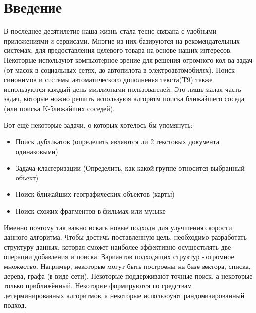 \newpage
\section{Введение}

\begin{justify}

    В последнее десятилетие наша жизнь стала тесно связана с 
    удобными приложениями и сервисами. Многие из них базируются 
    на рекомендательных системах, для предоставления целевого 
    товара на основе наших интересов. Некоторые используют 
    компьютерное зрение для решения огромного кол-ва задач 
    (от масок в социальных сетях, до автопилота в электроавтомобилях). 
    Поиск синонимов и системы автоматического дополнения текста(T9)
    также используются каждый день миллионами пользователей. Это лишь
    малая часть задач, которые можно решить используюя алгоритм
    поиска ближайшего соседа (или поиска K-ближайших соседей).

    Вот ещё некоторые задачи, о которых хотелось бы упомянуть:
    \begin{itemize}
        \item Поиск дубликатов (определить являются ли 2 текстовых документа
        одинаковыми)
        \item Задача кластеризации (Определить, как какой группе относится 
        выбранный объект)
        \item Поиск ближайших географических объектов (карты)
        \item Поиск схожих фрагментов в фильмах или музыке
    \end{itemize}

    Именно поэтому так важно искать новые подходы для улучшения 
    скорости данного алгоритма. Чтобы достичь поставленную цель, 
    необходимо разработать структуру данных, которая сможет наиболее
    эффективно осуществлять две операции добавления и поиска. Вариантов 
    подходящих структур - огромное множество. Например, некоторые
    могут быть построены на базе вектора, списка, дерева, графа (в
    виде сети). Некоторые поддерживают точные поиск, а некоторые только
    приближённый. Некоторые формируются по средствам детерминированных
    алгоритмов, а некоторые использоуют рандомизированный подход. 
    

\end{justify}
